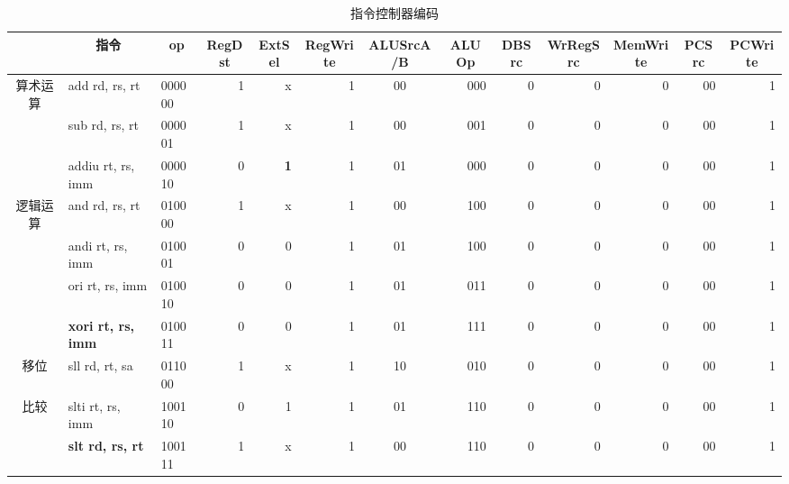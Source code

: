 \begin{table}
  \centering\xiaowu
  \caption{指令控制器编码}
    \begin{tabular}{|c|l|l|r|r|r|cc|r|r|r|r|r|r|}
    \hline
          & \multicolumn{1}{c|}{指令} & \multicolumn{1}{c|}{op} & \multicolumn{1}{c|}{RegDst} & \multicolumn{1}{c|}{ExtSel} & \multicolumn{1}{c|}{RegWrite} & \multicolumn{2}{c|}{ALUSrcA/B} & \multicolumn{1}{c|}{ALUOp} & \multicolumn{1}{c|}{DBSrc} & \multicolumn{1}{c|}{WrRegSrc} & \multicolumn{1}{c|}{MemWrite} & \multicolumn{1}{c|}{PCSrc} & \multicolumn{1}{c|}{PCWrite} \bigstrut\\
    \hline
    \multirow{3}[6]{*}{算术运算} & add rd, rs, rt & 000000 & 1     & x     & 1     & \multicolumn{2}{c|}{00} & 000   & 0     & 0     & 0     & 00    & 1 \bigstrut\\
\cline{2-14}          & sub rd, rs, rt & 000001 & 1     & x     & 1     & \multicolumn{2}{c|}{00} & 001   & 0     & 0     & 0     & 00    & 1 \bigstrut\\
\cline{2-14}          & addiu rt, rs, imm & 000010 & 0     & \textbf{1} & 1     & \multicolumn{2}{c|}{01} & 000   & 0     & 0     & 0     & 00    & 1 \bigstrut\\
    \hline
    \multirow{4}[8]{*}{逻辑运算} & and rd, rs, rt & 010000 & 1     & x     & 1     & \multicolumn{2}{c|}{00} & 100   & 0     & 0     & 0     & 00    & 1 \bigstrut\\
\cline{2-14}          & andi rt, rs, imm & 010001 & 0     & 0     & 1     & \multicolumn{2}{c|}{01} & 100   & 0     & 0     & 0     & 00    & 1 \bigstrut\\
\cline{2-14}          & ori rt, rs, imm & 010010 & 0     & 0     & 1     & \multicolumn{2}{c|}{01} & 011   & 0     & 0     & 0     & 00    & 1 \bigstrut\\
\cline{2-14}          & \textbf{xori rt, rs, imm} & 010011 & 0     & 0     & 1     & \multicolumn{2}{c|}{01} & 111   & 0     & 0     & 0     & 00    & 1 \bigstrut\\
    \hline
    移位    & sll rd, rt, sa & 011000 & 1     & x     & 1     & \multicolumn{2}{c|}{10} & 010   & 0     & 0     & 0     & 00    & 1 \bigstrut\\
    \hline
    \multirow{2}[4]{*}{比较} & slti rt, rs, imm & 100110 & 0     & 1     & 1     & \multicolumn{2}{c|}{01} & 110   & 0     & 0     & 0     & 00    & 1 \bigstrut\\
\cline{2-14}          & \textbf{slt rd, rs, rt} & 100111 & 1     & x     & 1     & \multicolumn{2}{c|}{00} & 110   & 0     & 0     & 0     & 00    & 1 \bigstrut\\

\end{tabular}
\end{table}

